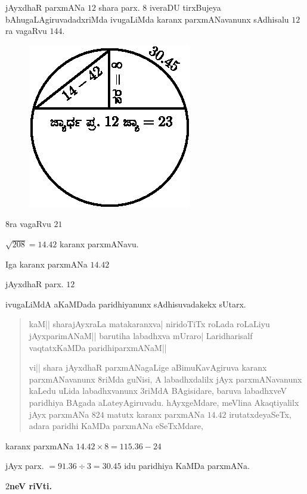 jAyxdhaR parxmANa $12$ shara parx. $8$ iveraDU tirxBujeya
bAhugaLAgiruvadadxriMda ivugaLiMda karanx parxmANavanunx sAdhisalu
$12$ra vagaRvu $144$.
\begin{figure}[H]
\centering
\includegraphics{figure/fig38.eps}
\end{figure}

$8$ra vagaRvu $21$

$\sqrt{208}=14.42$ karanx parxmANavu.

Iga karanx parxmANa $14.42$

jAyxdhaR parx. $12$

ivugaLiMdA aKaMDada paridhiyanunx sAdhisuvadakekx sUtarx.

\begin{verse}
kaM|| sharajAyxraLa matakaranxva| niridoTiTx roLada roLaLiyu
jAyxparimANaM|| barutiha labadhxva mUraro| Laridharisalf vaqtatxKaMDa
paridhiparxmANaM|| 

vi|| shara jAyxdhaR parxmANagaLige aBimuKavAgiruva karanx
parxmANavanunx $8$riMda guNisi, A labadhxdalilx jAyx parxmANavanunx
kaLedu uLida labadhxvanunx $3$riMdA BAgisidare, baruva labadhxveV
paridhiya BAgada aLateyAgiruvadu. hAyxgeMdare, meVlina Akaqtiyalilx
jAyx parxmANa $824$ matutx karanx parxmANa $14.42$ irutatxdeyaSeTx,
adara paridhi KaMDa parxmANa eSeTxMdare,
\end{verse}

karanx parxmANa $14.42\times 8=115.36-24$

jAyx parx. $=91.36\div 3=30.45$ idu paridhiya KaMDa parxmANa.

\medskip

\begin{center}
{\bf $2$neV riVti.}
\end{center}

